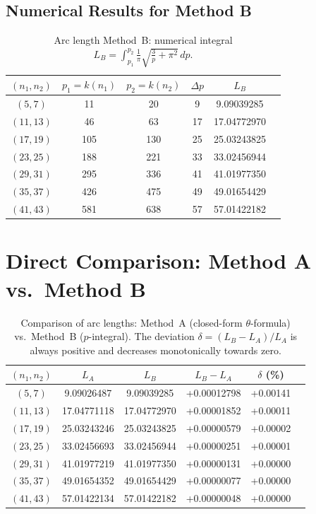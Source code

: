 \subsection{Numerical Results for Method B}

\begin{table}[H]
\centering
\caption{Arc length Method~B: numerical integral
  $L_B = \int_{p_1}^{p_2} \frac{1}{\pi}\sqrt{\frac{3}{p}+\pi^2}\,dp$.}
\renewcommand{\arraystretch}{1.2}
\begin{tabular}{cccccc}
\toprule
$(n_1, n_2)$ & $p_1 = k(n_1)$ & $p_2 = k(n_2)$ & $\Delta p$ & $L_B$ \\
\midrule
$( 5,  7)$ &  11 &  20 &  9 &  9.09039285 \\
$(11, 13)$ &  46 &  63 & 17 & 17.04772970 \\
$(17, 19)$ & 105 & 130 & 25 & 25.03243825 \\
$(23, 25)$ & 188 & 221 & 33 & 33.02456944 \\
$(29, 31)$ & 295 & 336 & 41 & 41.01977350 \\
$(35, 37)$ & 426 & 475 & 49 & 49.01654429 \\
$(41, 43)$ & 581 & 638 & 57 & 57.01422182 \\
\bottomrule
\end{tabular}
\end{table}


\section{Direct Comparison: Method A vs.\ Method B}
\label{sec:methoden_vergleich}

\begin{table}[H]
\centering
\caption{Comparison of arc lengths: Method~A (closed-form $\theta$-formula)
  vs.\ Method~B ($p$-integral). The deviation $\delta = (L_B - L_A)/L_A$
  is always positive and decreases monotonically towards zero.}
\renewcommand{\arraystretch}{1.25}
\begin{tabular}{cccccc}
\toprule
$(n_1, n_2)$ & $L_A$ & $L_B$ & $L_B - L_A$ & $\delta$ (\%) \\
\midrule
$( 5,  7)$ &  9.09026487 &  9.09039285 & +0.00012798 & +0.00141 \\
$(11, 13)$ & 17.04771118 & 17.04772970 & +0.00001852 & +0.00011 \\
$(17, 19)$ & 25.03243246 & 25.03243825 & +0.00000579 & +0.00002 \\
$(23, 25)$ & 33.02456693 & 33.02456944 & +0.00000251 & +0.00001 \\
$(29, 31)$ & 41.01977219 & 41.01977350 & +0.00000131 & +0.00000 \\
$(35, 37)$ & 49.01654352 & 49.01654429 & +0.00000077 & +0.00000 \\
$(41, 43)$ & 57.01422134 & 57.01422182 & +0.00000048 & +0.00000 \\
\bottomrule
\end{tabular}
\end{table}

